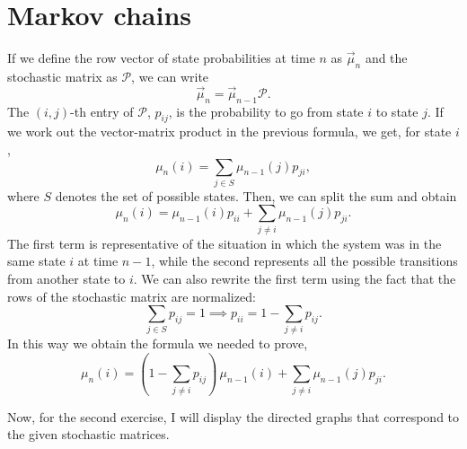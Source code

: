 \documentclass{gulartcl}
\begin{document}
\section{Markov chains}
If we define the row vector of state probabilities at time $n$ as
$\vec{\mu}_{n}$ and the stochastic matrix as $\mathcal{P}$, we can write
\begin{equation}
    \vec{\mu}_{n} = \vec{\mu}_{n-1} \mathcal{P}.
\end{equation}
The $(i, j)$-th entry of $\mathcal{P}$, $p_{ij}$, is the probability to go from
state $i$ to state $j$. If we work out the vector-matrix product in the previous
formula, we get, for state $i$,
\begin{equation}
    \mu_{n}(i) = \sum_{j \in S} \mu_{n-1}(j) p_{ji},
\end{equation}
where $S$ denotes the set of possible states. Then, we can split the sum and
obtain
\begin{equation}
    \mu_{n}(i) = \mu_{n-1}(i) p_{ii} + \sum_{j \neq i} \mu_{n-1}(j) p_{ji}.
\end{equation}
The first term is representative of the situation in which the system was in the
same state $i$ at time $n-1$, while the second represents all the possible
transitions from another state to $i$. We can also rewrite the first term using
the fact that the rows of the stochastic matrix are normalized:
\begin{equation}
    \sum_{j \in S} p_{ij} = 1 \implies p_{ii} = 1 - \sum_{j \neq i} p_{ij}.
\end{equation}
In this way we obtain the formula we needed to prove,
\begin{equation}
    \mu_{n}(i) = \left(1 - \sum_{j \neq i} p_{ij}\right)
    \, \mu_{n-1}(i) + \sum_{j \neq i} \mu_{n-1}(j) p_{ji}.
\end{equation}

Now, for the second exercise, I will display the directed graphs that correspond
to the given stochastic matrices.
\end{document}
